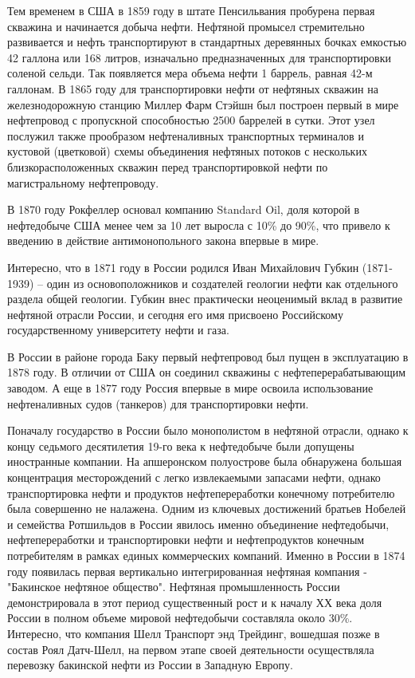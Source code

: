 Тем временем в США в 1859 году в штате Пенсильвания пробурена первая скважина и начинается добыча нефти.
Нефтяной промысел стремительно развивается и нефть транспортируют в стандартных деревянных бочках емкостью 42 галлона или 168 литров, изначально предназначенных для транспортировки соленой сельди.
Так появляется мера объема нефти 1 баррель, равная 42-м галлонам.
В 1865 году для транспортировки нефти от нефтяных скважин на железнодорожную станцию Миллер Фарм Стэйшн был построен первый в мире нефтепровод с пропускной способностью 2500 баррелей в сутки.
Этот узел послужил также прообразом нефтеналивных транспортных терминалов и кустовой (цветковой) схемы объединения нефтяных потоков с нескольких близкорасположенных скважин перед транспортировкой нефти по магистральному нефтепроводу.

В 1870 году Рокфеллер основал компанию Standard Oil, доля которой в нефтедобыче США менее чем за 10 лет выросла с 10\% до 90\%, что привело к введению в действие антимонопольного закона впервые в мире.

Интересно, что в 1871 году в России родился Иван Михайлович Губкин (1871-1939) -- один из основоположников и создателей геологии нефти как отдельного раздела общей геологии.
Губкин внес практически неоценимый вклад в развитие нефтяной отрасли России, и сегодня его имя присвоено Российскому государственному университету нефти и газа.

В России в районе города Баку первый нефтепровод был пущен в эксплуатацию в 1878 году.
В отличии от США он соединил скважины с нефтеперерабатывающим заводом.
А еще в 1877 году Россия впервые в мире освоила использование нефтеналивных судов (танкеров) для транспортировки нефти.
 
Поначалу государство в России было монополистом в нефтяной отрасли, однако к концу седьмого десятилетия 19-го века к нефтедобыче были допущены иностранные компании.
На апшеронском полуострове была обнаружена большая концентрация месторождений с легко извлекаемыми запасами нефти, однако транспортировка нефти и продуктов нефтепереработки конечному потребителю была совершенно не налажена.
Одним из ключевых достижений братьев Нобелей и семейства Ротшильдов в России явилось именно объединение нефтедобычи, нефтепереработки и транспортировки нефти и нефтепродуктов конечным потребителям в рамках единых коммерческих компаний.
Именно в России в 1874 году появилась первая вертикально интегрированная нефтяная компания - "Бакинское нефтяное общество".
Нефтяная промышленность России демонстрировала в этот период существенный рост и к началу ХХ века доля России в полном объеме мировой нефтедобычи составляла около 30\%.
Интересно, что компания Шелл Транспорт энд Трейдинг, вошедшая позже в состав Роял Датч-Шелл, на первом этапе своей деятельности осуществляла перевозку бакинской нефти из России в Западную Европу.

